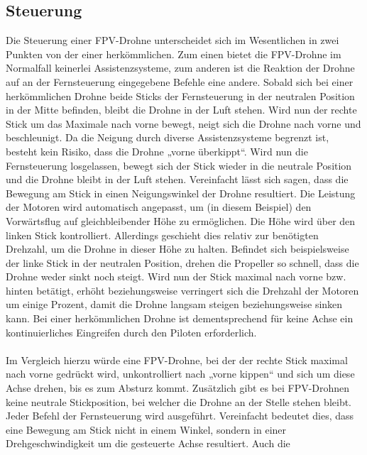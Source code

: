     \newpage
    \subsection[Steuerung]{Steuerung}
        Die Steuerung einer FPV-Drohne unterscheidet sich im Wesentlichen in zwei Punkten von der einer
        herkömmlichen. Zum einen bietet die FPV-Drohne im Normalfall keinerlei Assistenzsysteme, zum anderen
        ist die Reaktion der Drohne auf an der Fernsteuerung eingegebene Befehle eine andere. Sobald sich
        bei einer herkömmlichen Drohne beide Sticks der Fernsteuerung in der neutralen Position in der Mitte
        befinden, bleibt die Drohne in der Luft stehen. Wird nun der rechte Stick um das Maximale nach vorne
        bewegt, neigt sich die Drohne nach vorne und beschleunigt. Da die Neigung durch diverse Assistenzsysteme
        begrenzt ist, besteht kein Risiko, dass die Drohne „vorne überkippt“. Wird nun die Fernsteuerung
        losgelassen, bewegt sich der Stick wieder in die neutrale Position und die Drohne bleibt in der Luft
        stehen. Vereinfacht lässt sich sagen, dass die Bewegung am Stick in einen Neigungswinkel der Drohne resultiert.
        Die Leistung der Motoren wird automatisch angepasst, um (in diesem Beispiel) den Vorwärtsflug auf
        gleichbleibender Höhe zu ermöglichen. Die Höhe wird über den linken Stick kontrolliert. Allerdings
        geschieht dies relativ zur benötigten Drehzahl, um die Drohne in dieser Höhe zu halten. Befindet sich
        beispielsweise der linke Stick in der neutralen Position, drehen die Propeller so schnell, dass die
        Drohne weder sinkt noch steigt. Wird nun der Stick maximal nach vorne bzw. hinten betätigt, erhöht
        beziehungsweise verringert sich die Drehzahl der Motoren um einige Prozent, damit die Drohne langsam
        steigen beziehungsweise sinken kann. Bei einer herkömmlichen Drohne ist dementsprechend für keine Achse
        ein kontinuierliches Eingreifen durch den Piloten erforderlich. \\
        \\
        Im Vergleich hierzu würde eine FPV-Drohne, bei der der rechte Stick maximal nach vorne gedrückt wird,
        unkontrolliert nach „vorne kippen“ und sich um diese Achse drehen, bis es zum Absturz kommt. Zusätzlich
        gibt es bei FPV-Drohnen keine neutrale Stickposition, bei welcher die Drohne an der Stelle stehen bleibt.
        Jeder Befehl der Fernsteuerung wird ausgeführt. Vereinfacht bedeutet dies, dass eine Bewegung am Stick
        nicht in einem Winkel, sondern in einer Drehgeschwindigkeit um die gesteuerte Achse resultiert. Auch die
